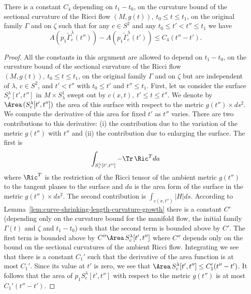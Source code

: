 \begin{claim}
\label{claim:area-forward-difference-linear-bound}
\label{areachange}
There is a constant $C_4$ depending on $t_1-t_0$, on the curvature
bound of the sectional curvature of the Ricci flow $(M,g(t)),\
t_0\le t\le t_1$, on the original family $\Gamma$ and on $\zeta$
such that for any $c\in S^2$ and any $t_0\le t'<t''\le t_1$ we have
$$A(p_1\widetilde \Gamma^\lambda_c(t''))-A(p_1\widetilde
\Gamma^\lambda_c(t'))\le C_4(t''-t').$$
\end{claim}

\begin{proof}
All the constants in this argument are allowed to depend on
$t_1-t_0$, on the curvature bound of the sectional curvature of the
Ricci flow $(M,g(t)),\ t_0\le t\le t_1$, on the original family
$\Gamma$ and on $\zeta$ but are independent of $\lambda$, $c\in
S^2$, and $t'<t''$ with $t_0\le t'$ and $t''\le t_1$. First, let us
consider the surface $S^\lambda_c[t',t'']$ in  $M\times S^1_\lambda$
swept out by $c(x,t),\ t'\le t\le t''$. We denote by $\Area\,(S^\lambda_c[t',t''])$ the area of this surface with respect
to the metric $g(t'')\times ds^2$. We compute the derivative of this
area for fixed $t'$ as $t''$ varies. There are two contributions to
this derivative: (i) the contribution due to the variation of the
metric $g(t'')$ with $t''$ and (ii) the contribution due to
enlarging the surface. The first is
$$\int_{S^\lambda_c[t',t'']}-\Tr\, \Ric^Tda$$
 where $\Ric^T$ is the restriction of the
Ricci tensor of the ambient metric $g(t'')$ to the tangent planes to
the surface and $da$ is the area form of the surface in the metric
$g(t'')\times ds^2$. The second contribution is
$\int_{c(x,t'')}|H|ds$. According to Lemma~\ref{lem:curve-shrinking-length-curvature-growth} there is a
constant $C'$ (depending only on the curvature bound for the
manifold flow, the initial family $\Gamma(t)$ and $\zeta$ and
$t_1-t_0$) such that the second term is bounded above by $C'$. The
first term is bounded above by $C''\Area\,S^\lambda_c[t',t'']$
where $C''$ depends only on the bound on the sectional curvatures of
the ambient Ricci flow. Integrating we see that there is a constant
$C_1'$ such that the derivative of the area function is at most
$C_1'$. Since its value at $t'$ is zero, we see that $\Area\,S^\lambda_c[t',t'']\le C'_1(t''-t')$. It follows that the
area of $p_1S^\lambda_c[t',t'']$ with respect to the metric $g(t'')$
is at most $C_1'(t''-t')$.


\end{proof}

